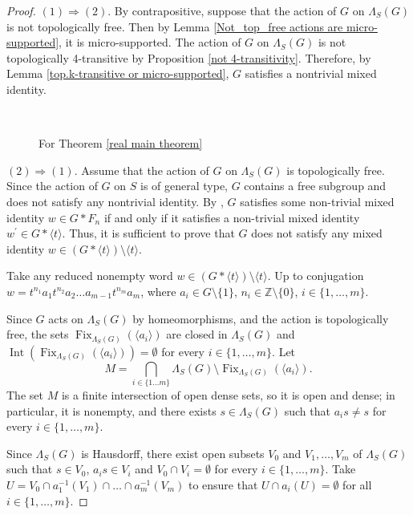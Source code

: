 \documentclass[11pt,letterpaper]{article}
\newcommand{\ZZ}{\mathbb{Z}}
\renewcommand{\l}{\langle}
\renewcommand{\r}{\rangle}
\DeclareMathOperator{\Int}{Int}
\DeclareMathOperator{\Fix}{Fix}
\theoremstyle{definition}
\theoremstyle{remark}
\begin{document}
\begin{proof}
$(1) \Rightarrow (2)$.
    By contrapositive, suppose that the action of $G$ on $\Lambda_S(G)$ is not topologically free. Then by Lemma \ref{Not_top_free actions are micro-supported}, it is micro-supported. The action of $G$ on $\Lambda_S(G)$ is not topologically 4-transitive by Proposition \ref{not 4-transitivity}. Therefore, by Lemma \ref{top.k-transitive or micro-supported}, $G$ satisfies a nontrivial mixed identity.

\begin{figure}
 \centering\\
  \caption{For Theorem \ref{real main theorem}}\label{fig}
\end{figure}
$(2) \Rightarrow (1)$.
Assume that the action of $G$ on $\Lambda_S(G)$ is topologically free. Since the action of $G$ on $S$ is of general type, $G$ contains a free subgroup and does not satisfy any nontrivial identity. By \cite[Rem. 5.1]{OH}, $G$ satisfies some non-trivial mixed identity $w \in G * F_n$ if and only if it satisfies a non-trivial mixed identity $w^{\prime} \in G *\l t\rangle$. Thus, it is sufficient to prove that $G$ does not satisfy any mixed identity  $w \in (G*\l t \r) \setminus \l t \r$.

Take any reduced nonempty word $w \in (G*\l t \r) \setminus \l t \r$. Up to conjugation $w = t^{n_1}a_1t^{n_2}a_2 \ldots a_{m-1}t^{n_m}a_m$, where $a_i \in G\setminus \{1\}$, $n_i \in \ZZ \setminus \{0\}$, $i \in \{1, \ldots, m\}$. 
    
Since $G$ acts on $\Lambda_S(G)$ by homeomorphisms, and the action is topologically free, the sets $\Fix_{\Lambda_S(G)}(\l a_i \r)$ are closed in $\Lambda_S(G)$ and $\Int(\Fix_{\Lambda_S(G)}(\l a_i \r)) = \emptyset$ for every $i \in \{1, \ldots, m\}$. Let 
    $$M = \bigcap\limits_{i \in \{1 \ldots m\}}\Lambda_S(G) \setminus\Fix_{\Lambda_S(G)}(\l a_i \r).$$
The set $M$ is a finite intersection of open dense sets, so it is open and dense; in particular, it is nonempty, and there exists $s \in \Lambda_S(G)$ such that $a_is \neq s$ for every $i \in \{1, \ldots, m\}$.
        
Since $\Lambda_S(G)$ is Hausdorff, there exist open subsets $V_0$ and $V_1, \ldots, V_m$ of $\Lambda_S(G)$ such that $s \in V_0$, $a_is \in V_i$ and $ V_0 \cap V_i =\emptyset$ for every $i \in \{1, \ldots, m\}$. Take $U = V_0 \cap a_1^{-1}(V_1) \cap \ldots \cap a_m^{-1}(V_m)$ to ensure that $U \cap a_i(U) = \emptyset$ for all $i \in \{1, \ldots, m\}$. 
    

\end{proof}
\end{document}
